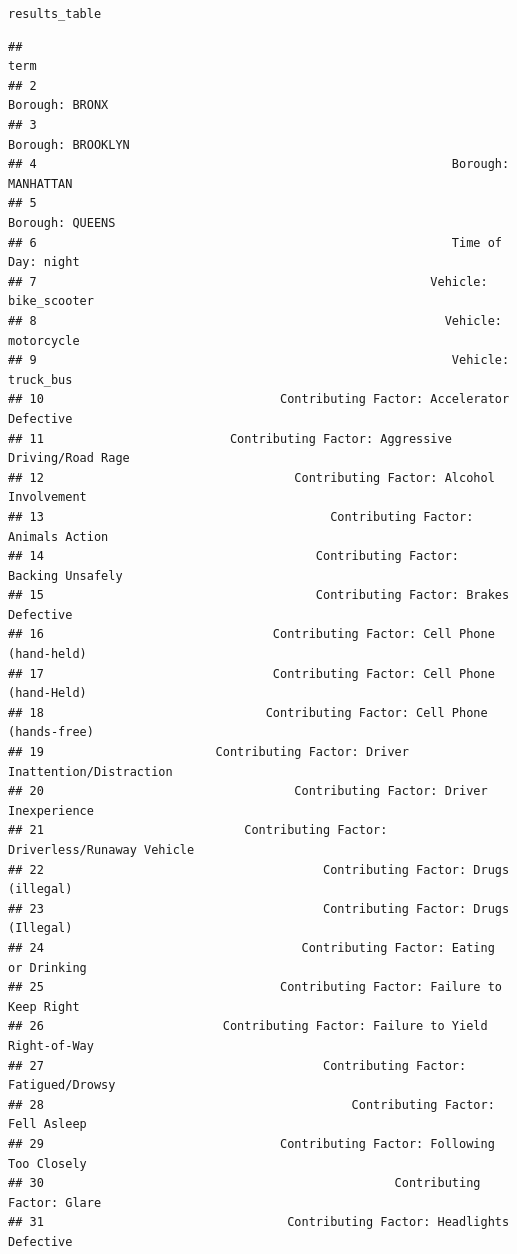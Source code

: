 \documentclass[10pt]{article}\usepackage[]{graphicx}\usepackage[]{xcolor}
\makeatletter
\newcommand{\hldef}[1]{\textcolor[rgb]{0.345,0.345,0.345}{#1}}%
\newenvironment{kframe}{%
 \def\at@end@of@kframe{}%
 \ifinner\ifhmode%
  \def\at@end@of@kframe{\end{minipage}}%
  \begin{minipage}{\columnwidth}%
 \fi\fi%
 \def\FrameCommand##1{\hskip\@totalleftmargin \hskip-\fboxsep
 \colorbox{shadecolor}{##1}\hskip-\fboxsep
     \hskip-\linewidth \hskip-\@totalleftmargin \hskip\columnwidth}%
 \MakeFramed {\advance\hsize-\width
   \@totalleftmargin\z@ \linewidth\hsize
   \@setminipage}}%
 {\par\unskip\endMakeFramed%
 \at@end@of@kframe}
\newenvironment{knitrout}{}{} %
\makeatother
\begin{document}
\begin{knitrout}
\begin{kframe}
\begin{alltt}
\hldef{results_table}
\end{alltt}
\begin{verbatim}
##                                                                          term
## 2                                                              Borough: BRONX
## 3                                                           Borough: BROOKLYN
## 4                                                          Borough: MANHATTAN
## 5                                                             Borough: QUEENS
## 6                                                          Time of Day: night
## 7                                                       Vehicle: bike_scooter
## 8                                                         Vehicle: motorcycle
## 9                                                          Vehicle: truck_bus
## 10                                 Contributing Factor: Accelerator Defective
## 11                          Contributing Factor: Aggressive Driving/Road Rage
## 12                                   Contributing Factor: Alcohol Involvement
## 13                                        Contributing Factor: Animals Action
## 14                                      Contributing Factor: Backing Unsafely
## 15                                      Contributing Factor: Brakes Defective
## 16                                Contributing Factor: Cell Phone (hand-held)
## 17                                Contributing Factor: Cell Phone (hand-Held)
## 18                               Contributing Factor: Cell Phone (hands-free)
## 19                        Contributing Factor: Driver Inattention/Distraction
## 20                                   Contributing Factor: Driver Inexperience
## 21                            Contributing Factor: Driverless/Runaway Vehicle
## 22                                       Contributing Factor: Drugs (illegal)
## 23                                       Contributing Factor: Drugs (Illegal)
## 24                                    Contributing Factor: Eating or Drinking
## 25                                 Contributing Factor: Failure to Keep Right
## 26                         Contributing Factor: Failure to Yield Right-of-Way
## 27                                       Contributing Factor: Fatigued/Drowsy
## 28                                           Contributing Factor: Fell Asleep
## 29                                 Contributing Factor: Following Too Closely
## 30                                                 Contributing Factor: Glare
## 31                                  Contributing Factor: Headlights Defective

\end{verbatim}
\end{kframe}
\end{knitrout}
\end{document}
